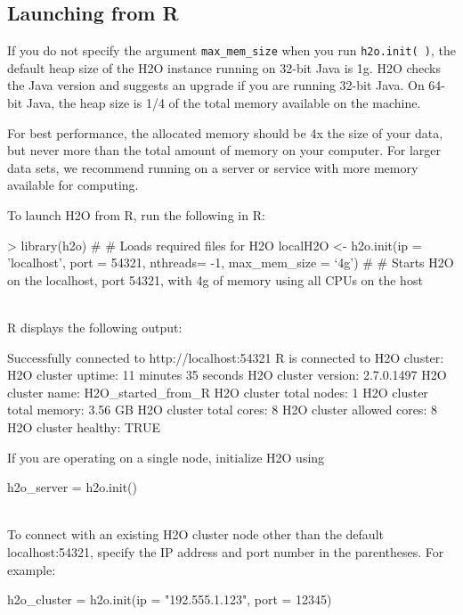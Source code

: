 \documentclass{article}[11pt]
\begin{document}
\subsection{Launching from R}

If you do not specify the argument {\texttt{max\_mem\_size}} when you run {\texttt{h2o.init( )}}, the default heap size of the H2O instance running on 32-bit Java is 1g. H2O checks the Java version and suggests an upgrade if you are running 32-bit Java. On 64-bit Java, the heap size is 1/4 of the total memory available on the machine. 

For best performance, the allocated memory should be 4x the size of your data, but never more than the total amount of memory on your computer. For larger data sets, we recommend running on a server or service with more memory available for computing.


To launch H2O from R, run the following in R:
\begin{spverbatim}
> library(h2o) # # Loads required files for H2O
localH2O <- h2o.init(ip = 'localhost', port = 54321, nthreads= -1, max_mem_size = ‘4g') # # Starts H2O on the localhost, port 54321, with 4g of memory using all CPUs on the host  \end{spverbatim} 
\\

R displays the following output: 
\begin{spverbatim}
Successfully connected to http://localhost:54321
       R is connected to H2O cluster:
   H2O cluster uptime:         11 minutes 35 seconds
   H2O cluster version:        2.7.0.1497
   H2O cluster name:           H2O_started_from_R
   H2O cluster total nodes:    1
   H2O cluster total memory:   3.56 GB
   H2O cluster total cores:    8
   H2O cluster allowed cores:  8
   H2O cluster healthy:        TRUE
\end{spverbatim}

If you are operating on a single node, initialize H2O using \begin{spverbatim} h2o_server = h2o.init()\end{spverbatim}\\

To connect with an existing H2O cluster node other than the default localhost:54321, specify the IP address and port number in the parentheses. For example: \begin{spverbatim}h2o_cluster = h2o.init(ip = "192.555.1.123", port = 12345)\end{spverbatim}
\end{document}
